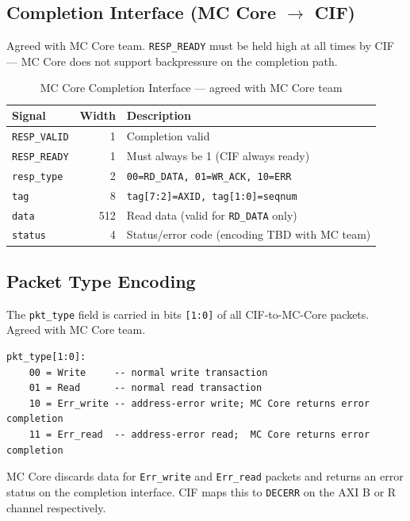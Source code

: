 \documentclass[11pt, a4paper]{article}
\begin{document}
\subsection{Completion Interface (MC Core \texorpdfstring{$\rightarrow$}{->} CIF)}

Agreed with MC Core team. \texttt{RESP\_READY} must be held high at all times by CIF — MC Core does not support backpressure on the completion path.

\begin{table}[h]
\centering
\begin{tabular}{lrl}
\toprule
\textbf{Signal} & \textbf{Width} & \textbf{Description} \\
\midrule
\texttt{RESP\_VALID}    & 1   & Completion valid \\
\texttt{RESP\_READY}    & 1   & Must always be 1 (CIF always ready) \\
\texttt{resp\_type}     & 2   & \texttt{00=RD\_DATA, 01=WR\_ACK, 10=ERR} \\
\texttt{tag}            & 8   & \texttt{tag[7:2]=AXID, tag[1:0]=seqnum} \\
\texttt{data}           & 512 & Read data (valid for \texttt{RD\_DATA} only) \\
\texttt{status}         & 4   & Status/error code (encoding TBD with MC team) \\
\bottomrule
\end{tabular}
\caption{MC Core Completion Interface — agreed with MC Core team}
\end{table}

\subsection{Packet Type Encoding}

The \texttt{pkt\_type} field is carried in bits \texttt{[1:0]} of all CIF-to-MC-Core packets. Agreed with MC Core team.

\begin{lstlisting}
pkt_type[1:0]:
    00 = Write     -- normal write transaction
    01 = Read      -- normal read transaction
    10 = Err_write -- address-error write; MC Core returns error completion
    11 = Err_read  -- address-error read;  MC Core returns error completion
\end{lstlisting}

MC Core discards data for \texttt{Err\_write} and \texttt{Err\_read} packets and returns an error status on the completion interface. CIF maps this to \texttt{DECERR} on the AXI B or R channel respectively.
\end{document}
